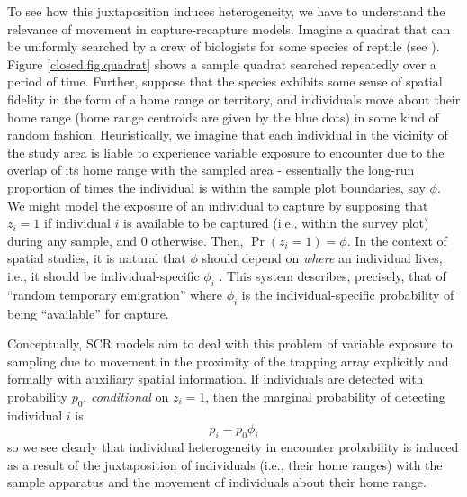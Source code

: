 To see how this juxtaposition induces heterogeneity, we have to
understand the relevance of movement in capture-recapture models.
Imagine a quadrat that can be uniformly searched by a crew of
biologists for some species of reptile (see
\citet{royle_young:2008}).  Figure \ref{closed.fig.quadrat} shows a
sample quadrat searched repeatedly over a period of time. Further,
suppose that the species exhibits some sense of spatial fidelity in the
form of a home range or territory, and individuals move about their
home range (home range centroids are given by the blue dots) in some
kind of random fashion.
Heuristically, we imagine that each individual in
the vicinity of the study area is liable to experience variable
exposure to encounter due to the overlap of its home range with the
sampled area - essentially the long-run proportion of times the
individual is within the sample plot boundaries, say $\phi$. We
might model the exposure of an individual to capture by supposing that
$z_{i} = 1$ if individual $i$ is available to be captured (i.e.,
within the survey plot) during any sample, and $0$ otherwise. Then,
$\Pr(z_{i}=1) = \phi$.  In the context of spatial studies, it is
natural that $\phi$ should depend on {\it where} an individual lives,
i.e., it should be individual-specific $\phi_{i}$
\citep{chandler_etal:2011}. This system describes, precisely, that of
``random temporary emigration'' \citep{kendall_etal:1997} where $\phi_{i}$
is the individual-specific probability of being ``available'' for
capture.

Conceptually, SCR models aim to deal with
this problem of variable exposure to sampling due to movement in the
proximity of the trapping array explicitly and formally with auxiliary
spatial information.  If individuals are detected with probability
$p_{0}$, {\it conditional} on $z_{i} = 1$, then the marginal
probability of detecting  individual $i$ is
\[
 p_{i} = p_{0}\phi_{i}
\]
so we see clearly that individual heterogeneity in encounter
probability is induced as a result of the juxtaposition of individuals
(i.e., their home ranges) with the sample apparatus and the movement
of individuals about their home range.

